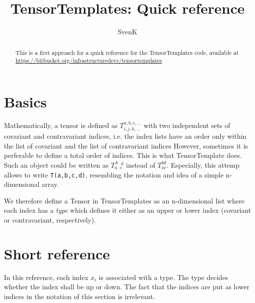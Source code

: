 \documentclass{article}
\begin{document}
\title{TensorTemplates: Quick reference} 
\author{SvenK}

\maketitle

\begin{abstract}
This is a first approach for a quick
reference for the TensorTemplates code,
available at
\url{https://bitbucket.org/infrastructuredevs/tensortemplates}
\end{abstract}

\section{Basics}

Mathematically, a tensor is defined as $T^{a,b,c,\dots}_{i,j,k,\dots}$ with two independent sets of covariant and contravariant indices, i.e. the index lists have an order only within the list of covariant and the list of contravariant indices However, sometimes it is perferable to define a total order of indices. This is what TensorTemplate does. Such an object could be written as $T_a^{~b} {~}_c^{~d}$ instead of $T_{ac}^{bd}$. Especially, this attemp allows to write \texttt{T(a,b,c,d)}, resembling the notation and idea of a simple n-dimensional array.

We therefore define a Tensor in TensorTemplates as an n-dimensional list where each index has a \emph{type} which defines it either as an upper or lower index (covariant or contravariant, respectively).

\section{Short reference}
In this reference, each index $x_i$ is
associated with a type. The type decides whether
the index shall be up or down. The fact that
the indices are put as lower indices in the
notation of this section is irrelevant.
\end{document}
